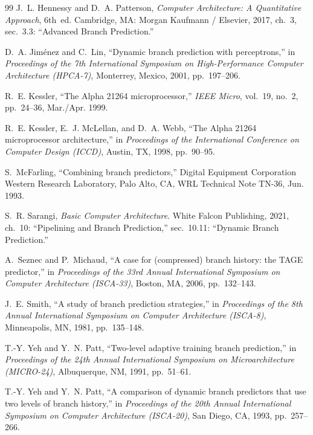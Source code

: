 \documentclass[11pt,a4paper]{article}
\begin{document}
\clearpage

\begin{thebibliography}{99}
J.~L. Hennessy and D.~A. Patterson, \textit{Computer Architecture: A Quantitative Approach}, 6th~ed. Cambridge, MA: Morgan Kaufmann / Elsevier, 2017, ch.~3, sec.~3.3: ``Advanced Branch Prediction.''

D.~A. Jim{\'e}nez and C.~Lin, ``Dynamic branch prediction with perceptrons,'' in \textit{Proceedings of the 7th International Symposium on High-Performance Computer Architecture (HPCA-7)}, Monterrey, Mexico, 2001, pp.~197--206.

R.~E. Kessler, ``The Alpha 21264 microprocessor,'' \textit{IEEE Micro}, vol.~19, no.~2, pp.~24--36, Mar./Apr. 1999.

R.~E. Kessler, E.~J. McLellan, and D.~A. Webb, ``The Alpha 21264 microprocessor architecture,'' in \textit{Proceedings of the International Conference on Computer Design (ICCD)}, Austin, TX, 1998, pp.~90--95.

S.~McFarling, ``Combining branch predictors,'' Digital Equipment Corporation Western Research Laboratory, Palo Alto, CA, WRL Technical Note TN-36, Jun. 1993.

S.~R. Sarangi, \textit{Basic Computer Architecture}. White Falcon Publishing, 2021, ch.~10: ``Pipelining and Branch Prediction,'' sec.~10.11: ``Dynamic Branch Prediction.''

A.~Seznec and P.~Michaud, ``A case for (compressed) branch history: the TAGE predictor,'' in \textit{Proceedings of the 33rd Annual International Symposium on Computer Architecture (ISCA-33)}, Boston, MA, 2006, pp.~132--143.

J.~E. Smith, ``A study of branch prediction strategies,'' in \textit{Proceedings of the 8th Annual International Symposium on Computer Architecture (ISCA-8)}, Minneapolis, MN, 1981, pp.~135--148.

T.-Y. Yeh and Y.~N. Patt, ``Two-level adaptive training branch prediction,'' in \textit{Proceedings of the 24th Annual International Symposium on Microarchitecture (MICRO-24)}, Albuquerque, NM, 1991, pp.~51--61.

T.-Y. Yeh and Y.~N. Patt, ``A comparison of dynamic branch predictors that use two levels of branch history,'' in \textit{Proceedings of the 20th Annual International Symposium on Computer Architecture (ISCA-20)}, San Diego, CA, 1993, pp.~257--266.
\end{thebibliography}
\end{document}
